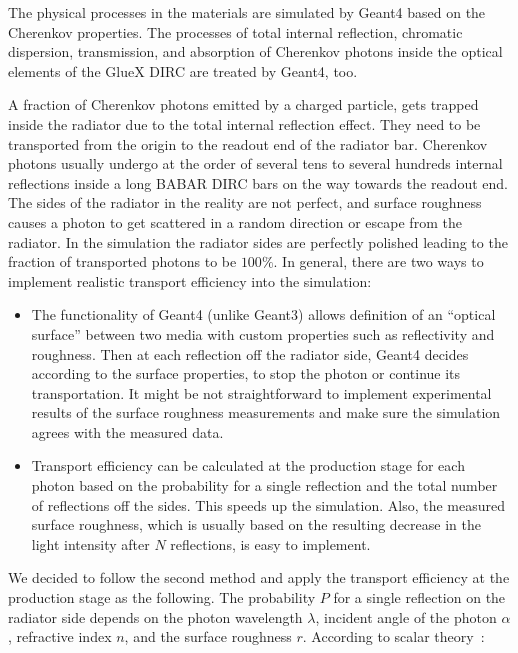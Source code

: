\documentclass[11pt, a4paper]{article}
\begin{document}
The physical processes in the materials are simulated by Geant4 based on the Cherenkov properties. The processes of total internal reflection, chromatic dispersion, transmission, and absorption of Cherenkov photons inside the optical elements of the GlueX DIRC are treated by Geant4, too.

A fraction of Cherenkov photons emitted by a charged particle, gets trapped inside the radiator due to the total internal reflection effect. They need to be transported from the origin to the readout end of the radiator bar. Cherenkov photons usually undergo at the order of several tens to several hundreds internal reflections inside a long BABAR DIRC bars on the way towards the readout end. The sides of the radiator in the reality are not perfect, and surface roughness causes a photon to get scattered in a random direction or escape from the radiator. In the simulation the radiator sides are perfectly polished leading to the fraction of transported photons to be $100\%$. In general, there are two ways to implement realistic transport efficiency into the simulation:

\begin{itemize}
\item The functionality of Geant4 (unlike Geant3) allows definition of an ``optical surface'' between two media with custom properties such as reflectivity and roughness. Then at each reflection off the radiator side, Geant4 decides according to the surface properties, to stop the photon or continue its transportation. It might be not straightforward to implement experimental results of the surface roughness measurements and make sure the simulation agrees with the measured data.
\item Transport efficiency can be calculated at the production stage for each photon based on the probability for a single reflection and the total number of reflections off the sides. This speeds up the simulation. Also, the measured surface roughness, which is usually based on the resulting decrease in the light intensity after $N$ reflections, is easy to implement.
\end{itemize}

We decided to follow the second method and apply the transport efficiency at the production stage as the following. The probability $P$ for a single reflection on the radiator side depends on the photon wavelength $\lambda$, incident angle of the photon $\alpha$, refractive index $n$, and the surface roughness $r$. According to scalar theory~\cite{scalar}:
\end{document}
